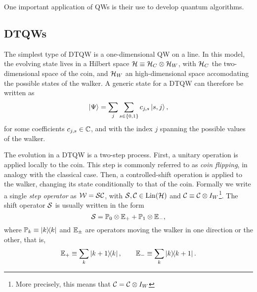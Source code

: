 One important application of QWs is their use to develop quantum algorithms.

\subsection{DTQWs}
The simplest type of DTQW is a one-dimensional QW on a line.
In this model, the evolving state lives in a Hilbert space $\mathcal{H}\equiv\mathcal{H}_C\otimes\mathcal{H}_W$, with $\mathcal{H}_C$ the two-dimensional space of the coin, and $\mathcal{H}_W$ an high-dimensional space accomodating the possible states of the walker.
A generic state for a DTQW can therefore be written as
\begin{equation}
    \ket\Psi = \sum_j \sum_{s\in\{0,1\}} c_{j,s} \ket{s, j},
\end{equation}
for some coefficients $c_{j,s}\in\mathbb{C}$, and with the index $j$ spanning the possible values of the walker.

The evolution in a DTQW is a two-step process.
First, a unitary operation is applied locally to the coin. This step is commonly referred to as \textit{coin flipping}, in analogy with the classical case.
Then, a controlled-shift operation is applied to the walker, changing its state conditionally to that of the coin.
Formally we write a single \textit{step operator} as $\mathcal{W}=\mathcal{S}\mathcal{C}$, with $\mathcal{S},\mathcal{C}\in\operatorname{Lin}(\mathcal{H})$ and $\mathcal{C}\equiv\mathcal{C}\otimes I_W$\footnote{More precisely, this means that $\mathcal{C}=\mathcal{C}\otimes I_W$}.
The shift operator $\mathcal{S}$ is usually written in the form
\begin{equation}
    \mathcal{S} = \mathbb{P}_0\otimes \mathbb{E}_+ + \mathbb{P}_1\otimes \mathbb{E}_-,
\end{equation}
where $\mathbb{P}_k\equiv\ketbra k$ and $\mathbb{E}_\pm$ are operators moving the walker in one direction or the other, that is,
\begin{equation}
    \mathbb{E}_+\equiv \sum_k \ketbra{k+1}{k},
    \qquad
    \mathbb{E}_-\equiv\sum_k\ketbra{k}{k+1}.
\end{equation}



